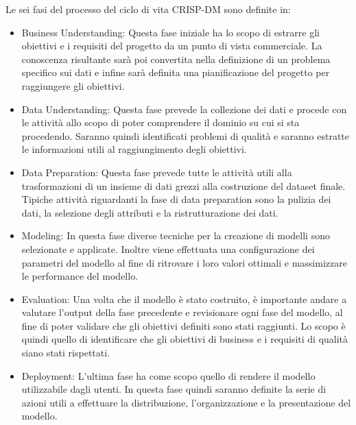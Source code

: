 Le sei fasi del processo del ciclo di vita CRISP-DM sono definite in:
\begin{itemize}
    \item Business Understanding: Questa fase iniziale ha lo scopo di estrarre gli obiettivi e i requisiti del progetto da un punto di vista commerciale. La conoscenza risultante sarà poi convertita nella definizione di un problema specifico sui dati e infine sarà definita una pianificazione del progetto per raggiungere gli obiettivi.
    \item Data Understanding: Questa fase prevede la collezione dei dati e procede con le attività allo scopo di poter comprendere il dominio su cui si sta procedendo. Saranno quindi identificati problemi di qualità e saranno estratte le informazioni utili al raggiungimento degli obiettivi.
    \item Data Preparation: Questa fase prevede tutte le attività utili alla trasformazioni di un insieme di dati grezzi alla costruzione del dataset finale. Tipiche attività riguardanti la fase di data preparation sono la pulizia dei dati, la selezione degli attributi e la ristrutturazione dei dati.
    \item Modeling: In questa fase diverse tecniche per la creazione di modelli sono selezionate e applicate. Inoltre viene effettuata una configurazione dei parametri del modello al fine di ritrovare i loro valori ottimali e massimizzare le performance del modello.
    \item Evaluation: Una volta che il modello è stato costruito, è importante andare a valutare l'output della fase precedente e revisionare ogni fase del modello, al fine di poter validare che gli obiettivi definiti sono stati raggiunti. Lo scopo è quindi quello di identificare che gli obiettivi di business e i requisiti di qualità siano stati rispettati.
    \item Deployment: L'ultima fase ha come scopo quello di rendere il modello utilizzabile dagli utenti. In questa fase quindi saranno definite la serie di azioni utili a effettuare la distribuzione, l'organizzazione e la presentazione del modello. 
\end{itemize}

